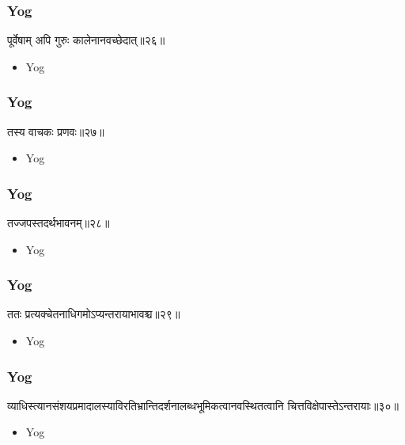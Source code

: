 \begin{frame}[fragile]\frametitle{Yog}
\begin{sanskrit}
पूर्वेषाम् अपि गुरुः कालेनानवच्छेदात्॥२६॥
\end{sanskrit}
	\begin{itemize}
	\item Yog 
	\end{itemize}
\end{frame}

\begin{frame}[fragile]\frametitle{Yog}
\begin{sanskrit}
तस्य वाचकः प्रणवः॥२७॥
\end{sanskrit}
	\begin{itemize}
	\item Yog 
	\end{itemize}
\end{frame}


\begin{frame}[fragile]\frametitle{Yog}
\begin{sanskrit}
तज्जपस्तदर्थभावनम्॥२८॥
\end{sanskrit}
	\begin{itemize}
	\item Yog 
	\end{itemize}
\end{frame}


\begin{frame}[fragile]\frametitle{Yog}
\begin{sanskrit}
ततः प्रत्यक्चेतनाधिगमोऽप्यन्तरायाभावश्च॥२९॥
\end{sanskrit}
	\begin{itemize}
	\item Yog 
	\end{itemize}
\end{frame}




\begin{frame}[fragile]\frametitle{Yog}
\begin{sanskrit}
व्याधिस्त्यानसंशयप्रमादालस्याविरतिभ्रान्तिदर्शनालब्धभूमिकत्वानवस्थितत्वानि चित्तविक्षेपास्तेऽन्तरायाः॥३०॥
\end{sanskrit}
	\begin{itemize}
	\item Yog 
	\end{itemize}
\end{frame}




